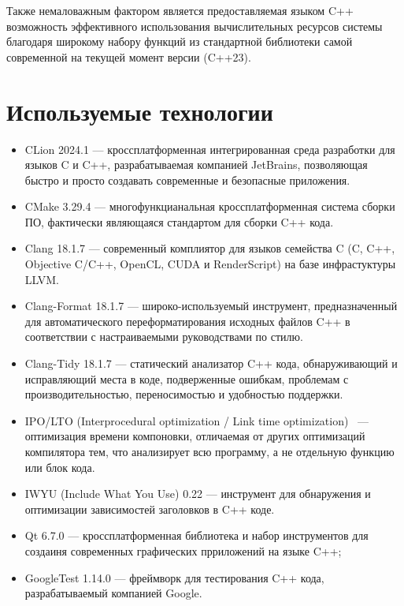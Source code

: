Также немаловажным фактором является предоставляемая языком C++ возможность эффективного использования вычислительных ресурсов системы благодаря широкому набору функций из стандартной библиотеки самой современной на текущей момент версии (C++23).

\section{Используемые технологии}

\begin{itemize}
	\item CLion 2024.1 \cite{clion} — кроссплатформенная интегрированная среда разработки для языков C и C++, разрабатываемая компанией JetBrains, позволяющая быстро и просто создавать современные и безопасные приложения.
	\item CMake 3.29.4 \cite{cmake} — многофункцианальная кроссплатформенная система сборки ПО, фактически являющаяся стандартом для сборки C++ кода.
	\item Clang 18.1.7 \cite{clang} — современный комплиятор для языков семейства C (C, C++, Objective C/C++, OpenCL, CUDA и RenderScript) на базе инфрастуктуры LLVM.
	\item Clang-Format 18.1.7 \cite{clang-format} — широко-используемый инструмент, предназначенный для автоматического переформатирования исходных файлов C++ в соответствии с настраиваемыми руководствами по стилю.
	\item Clang-Tidy 18.1.7 \cite{clang-tidy} — статический анализатор C++ кода, обнаруживающий и исправляющий места в коде, подверженные ошибкам, проблемам с производительностью, переносимостью и удобностью поддержки.
	\item IPO/LTO (Interprocedural optimization / Link time optimization) \cite{ipo-lto}~— оптимизация времени компоновки, отличаемая от других оптимизаций компилятора тем, что анализирует всю программу, а не отдельную функцию или блок кода.
	\item IWYU (Include What You Use) 0.22 \cite{iwyu} — инструмент для обнаружения и оптимизации зависимостей заголовков в C++ коде.
	\item Qt 6.7.0 \cite{qt} — кроссплатформенная библиотека и набор инструментов для создаиня современных графических прриложений на языке C++;
	\item GoogleTest 1.14.0 \cite{googletest} — фреймворк для тестирования C++ кода, разрабатываемый компанией Google.
\end{itemize}


